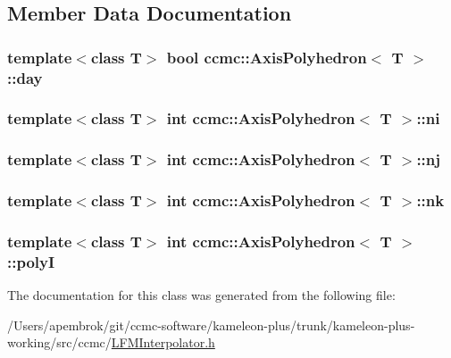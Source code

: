 \subsection{Member Data Documentation}
\hypertarget{classccmc_1_1_axis_polyhedron_a1f981cc1441ff15a0e5a80f666b3bcbb}{
\subsubsection[{day}]{\setlength{\rightskip}{0pt plus 5cm}template$<$class T$>$ bool {\bf ccmc\-::\-Axis\-Polyhedron}$<$ T $>$\-::day}}\label{classccmc_1_1_axis_polyhedron_a1f981cc1441ff15a0e5a80f666b3bcbb}
\hypertarget{classccmc_1_1_axis_polyhedron_ac3160e03e3b37a3ca3eb2022662f7bd2}{
\subsubsection[{ni}]{\setlength{\rightskip}{0pt plus 5cm}template$<$class T$>$ int {\bf ccmc\-::\-Axis\-Polyhedron}$<$ T $>$\-::ni}}\label{classccmc_1_1_axis_polyhedron_ac3160e03e3b37a3ca3eb2022662f7bd2}
\hypertarget{classccmc_1_1_axis_polyhedron_a62de873c6e6bd244a75fe64a2538f501}{
\subsubsection[{nj}]{\setlength{\rightskip}{0pt plus 5cm}template$<$class T$>$ int {\bf ccmc\-::\-Axis\-Polyhedron}$<$ T $>$\-::nj}}\label{classccmc_1_1_axis_polyhedron_a62de873c6e6bd244a75fe64a2538f501}
\hypertarget{classccmc_1_1_axis_polyhedron_a9fb6852015288390760e0e231daef379}{
\subsubsection[{nk}]{\setlength{\rightskip}{0pt plus 5cm}template$<$class T$>$ int {\bf ccmc\-::\-Axis\-Polyhedron}$<$ T $>$\-::nk}}\label{classccmc_1_1_axis_polyhedron_a9fb6852015288390760e0e231daef379}
\hypertarget{classccmc_1_1_axis_polyhedron_a86bf3b4fab1d62d902ecbc97b1ff2b7f}{
\subsubsection[{poly\-I}]{\setlength{\rightskip}{0pt plus 5cm}template$<$class T$>$ int {\bf ccmc\-::\-Axis\-Polyhedron}$<$ T $>$\-::poly\-I}}\label{classccmc_1_1_axis_polyhedron_a86bf3b4fab1d62d902ecbc97b1ff2b7f}


The documentation for this class was generated from the following file\-:\begin{DoxyCompactItemize}
\item 
/\-Users/apembrok/git/ccmc-\/software/kameleon-\/plus/trunk/kameleon-\/plus-\/working/src/ccmc/\hyperlink{_l_f_m_interpolator_8h}{L\-F\-M\-Interpolator.\-h}\end{DoxyCompactItemize}
